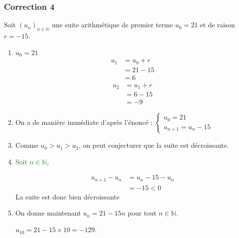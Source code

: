 \documentclass[15pt, mathserif]{beamer}
\newcommand{\N}{\mathbb{N}}			%
\newcommand{\st}[1]{$(#1_n)_{n \in \N}$}
\begin{document}
\begin{frame}
\vspace{-10mm}
	\frametitle{Correction 4}
Soit \st{u} une suite arithmétique de premier terme $u_0=21$ et de raison $r=-15$. 
 
 \begin{enumerate} 
 	 \item \begin{multicols}{3} 
 
 $u_0=21$ 
 \columnbreak 
 \begin{align*} 
 u_1 &= u_0+r \\ 
 &= 21-15\\ 
 &= 6 
 \end{align*}  
 \columnbreak 
 \begin{align*} 
 u_2 &= u_1+r \\ 
 &= 6-15\\ 
 &= -9 
 \end{align*} 
 \end{multicols} 
 \vfil 
 	 \item On a de manière immédiate d'après l'énoncé : 
 \hfil$\begin{cases} 
 u_0=21 \\ 
 u_{n+1}=u_n-15 
 \end{cases}$ 
 \vfil 
 	 \item Comme $u_0>u_1>u_2$, on peut conjecturer que la suite est décroissante.
 \end{enumerate} 
 
 \end{frame} 
 
 \begin{frame}  
 \begin{enumerate} \setcounter{enumi}{3} 
 	 \item \textcolor{green}{Soit $n \in \N$}, 
 
  \begin{align*} 
 u_{n+1}-u_n &= u_n -15-u_n \\ 
 &= -15<0 
 \end{align*}La suite est donc bien décroissante
 \vfil 
 	 \item  On donne maintenant $u_n=21-15n$ pour tout $n \in \N$. 
 
  \hfil$u_{10}=21-15\times 10=-129$. 
 
 \end{enumerate} \end{frame}
\end{document}
